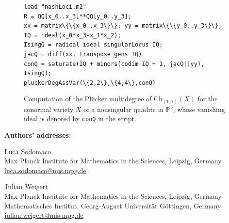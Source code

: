 \documentclass[12pt]{article}
\theoremstyle{definition}
\newcommand{\PP}{{\mathbb P}}
\begin{document}
\begin{figure}[h]
\centering
\begin{tcolorbox}[size=fbox,width=\linewidth,colback=blue!5!white,colframe=blue!75!black]
\begin{Verbatim}[fontsize=\small,commandchars=\\\{\}]
load "nashLoci.m2"
R = QQ[x_0..x_3]**QQ[y_0..y_3];
xx = matrix\{\{x_0..x_3\}\}; yy = matrix\{\{y_0..y_3\}\};
IQ = ideal(x_0*x_3-x_1*x_2);
IsingQ = radical ideal singularLocus IQ;
jacQ = diff(xx, transpose gens IQ)
conQ = saturate(IQ + minors(codim IQ + 1, jacQ||yy), IsingQ);
pluckerDegAssVar(\{2,2\},\{4,4\},conQ)
\end{Verbatim}
\end{tcolorbox}
\caption{Computation of the Pl\"ucker multidegree of $\mathrm{Ch}_{(1,1)}(X)$ for the conormal variety $X$ of a nonsingular quadric in $\PP^3$, whose vanishing ideal is denoted by \texttt{conQ} in the script.}\label{fig: pluckerDegAssVar}
\end{figure}






\bigskip \medskip \bigskip

\noindent
\small {\bf Authors' addresses:}
\smallskip

\noindent Luca Sodomaco\\
Max Planck Institute for Mathematics in the Sciences, Leipzig, Germany\\
\url{luca.sodomaco@mis.mpg.de}

\medskip

\noindent Julian Weigert\\
Max Planck Institute for Mathematics in the Sciences, Leipzig, Germany\\
Mathematisches Institut, Georg-August Universit\"at G\"ottingen, Germany\\ \url{julian.weigert@mis.mpg.de}
\end{document}
